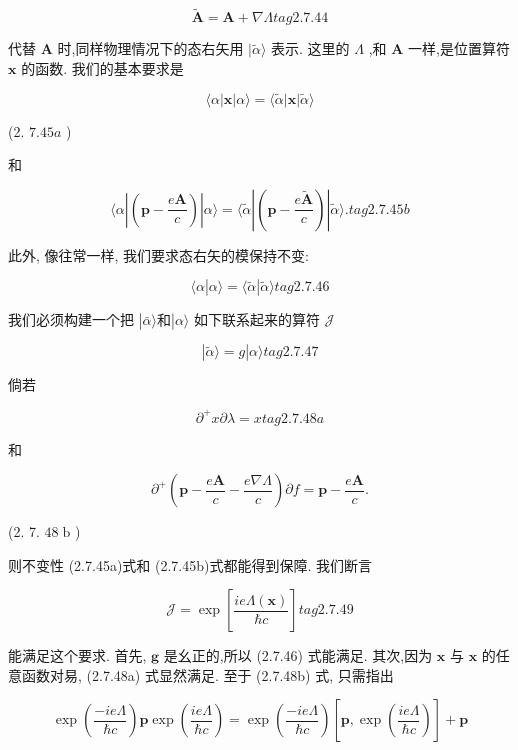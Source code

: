 \documentclass[lang=cn,newtx,10pt,scheme=chinese,thmcnt=section]{elegantbook}
\begin{document}
$$
\widetilde{\mathbf{A}} = \mathbf{A} + \nabla \Lambda tag{2.7.44}
$$

代替 $\mathbf{A}$ 时,同样物理情况下的态右矢用 $|\widetilde{\alpha }\rangle$ 表示. 这里的 $\Lambda$ ,和 $\mathbf{A}$ 一样,是位置算符 $\mathbf{x}$ 的函数. 我们的基本要求是

$$
\langle \alpha \left| \mathbf{x}\right| \alpha \rangle = \langle \widetilde{\alpha }\left| \mathbf{x}\right| \widetilde{\alpha }\rangle
$$

(2. ${7.45a}$ )

和

$$
\langle \alpha \left| \left( {\mathbf{p} - \frac{e\mathbf{A}}{c}}\right) \right| \alpha \rangle = \langle \widetilde{\alpha }\left| \left( {\mathbf{p} - \frac{e\widetilde{\mathbf{A}}}{c}}\right) \right| \widetilde{\alpha }\rangle . tag{2.7.45b}
$$

此外, 像往常一样, 我们要求态右矢的模保持不变:

$$
\langle \alpha | \alpha \rangle = \langle \widetilde{\alpha } | \widetilde{\alpha }\rangle tag{2.7.46}
$$

我们必须构建一个把 $\left| {\bar{\alpha }\rangle \text{和}}\right| \alpha \rangle$ 如下联系起来的算符 $\mathcal{J}$

$$
\left| {\widetilde{\alpha }\rangle = g}\right| \alpha \rangle tag{2.7.47}
$$

倘若

$$
{\partial }^{ + }x\partial \lambda = x tag{2.7.48a}
$$

和

$$
{\partial }^{ + }\left( {\mathbf{p} - \frac{e\mathbf{A}}{c} - \frac{e\nabla \Lambda }{c}}\right) \partial f = \mathbf{p} - \frac{e\mathbf{A}}{c}.
$$

(2. 7. ${48}\mathrm{\;b}$ )

则不变性 (2.7.45a)式和 (2.7.45b)式都能得到保障. 我们断言

$$
\mathcal{J} = \exp \left\lbrack \frac{{ie\Lambda }\left( \mathbf{x}\right) }{\hbar c}\right\rbrack tag{2. 7.49}
$$

能满足这个要求. 首先, $\mathbf{g}$ 是幺正的,所以 (2.7.46) 式能满足. 其次,因为 $\mathbf{x}$ 与 $\mathbf{x}$ 的任意函数对易, (2.7.48a) 式显然满足. 至于 (2.7.48b) 式, 只需指出

$$
\exp \left( \frac{-{ie\Lambda }}{\hbar c}\right) \mathbf{p}\exp \left( \frac{ie\Lambda }{\hbar c}\right) = \exp \left( \frac{-{ie\Lambda }}{\hbar c}\right) \left\lbrack {\mathbf{p},\exp \left( \frac{ie\Lambda }{\hbar c}\right) }\right\rbrack + \mathbf{p}
$$
\end{document}
